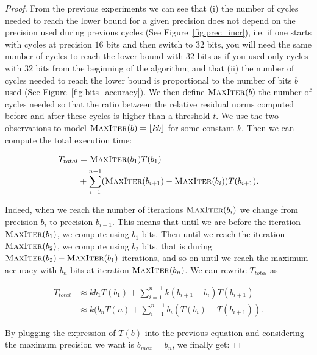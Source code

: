 \begin{proof}

    From the previous experiments we can see that (i) the number of cycles
    needed to reach the lower bound for a given precision does not depend on
    the precision used during previous cycles (See Figure~\ref{fig.prec_incr}),
    i.e.  if one starts with cycles at precision $16$ bits and then switch to
    $32$ bits, you will need the same number of cycles to reach the lower bound
    with $32$ bits as if you used only cycles with $32$ bits from the beginning
    of the algorithm; and that (ii) the number of cycles needed to reach the
    lower bound is proportional to the number of bits $b$ used (See
    Figure~\ref{fig.bits_accuracy}). We then define $\textsc{MaxIter}(b)$ the
    number of cycles needed so that the ratio between the relative
    residual norms computed before and after these cycles is higher than a threshold $t$. 
    We use the two observations
    to model $\textsc{MaxIter}(b) = \lfloor kb \rfloor$ for some constant $k$.
    Then we can compute the total execution time:

    \begin{align*}
        T_{total}& = \textsc{MaxIter}(b_1)T(b_1)\\ & +  \sum\limits_{i=1}^{n-1}
        (\textsc{MaxIter}(b_{i+1})-\textsc{MaxIter}(b_i))T(b_{i+1}).
    \end{align*}

    Indeed, when we reach the number of iterations $\textsc{MaxIter}(b_i)$ we
    change from precision $b_i$ to precision $b_{i+1}$. This means that until we are before the iteration $\textsc{MaxIter}(b_1)$, we compute using $b_1$ bits. Then until we reach the iteration $\textsc{MaxIter}(b_2)$, we compute using $b_2$ bits, that is during $\textsc{MaxIter}(b_2) - \textsc{MaxIter}(b_1)$ iterations, and so on until we reach the maximum accuracy with $b_n$ bits at iteration $\textsc{MaxIter}(b_n)$.  We can rewrite
    $T_{total}$ as

    \begin{align*}
        T_{total} &\approx k b_{1} T(b_1) + \sum\limits_{i=1}^{n-1}
        k(b_{i+1}-b_{i})T(b_{i+1})\\ & \approx k ( b_{n}T(n) +
        \sum\limits_{i=1}^{n-1} b_i ( T(b_i) - T(b_{i+1})).
    \end{align*}

    By plugging the expression of $T(b)$ into the previous equation and considering
    the maximum precision we want is $b_{max}=b_n$, we finally get:


\end{proof}
